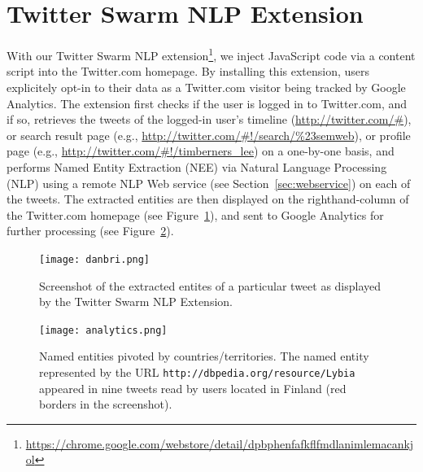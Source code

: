 \documentclass[runningheads,a4paper]{llncs}
\begin{document}
\section{Twitter Swarm NLP Extension}\label{sec:twitterswarm}
With our Twitter Swarm NLP extension\footnote{\url{https://chrome.google.com/webstore/detail/dpbphenfafkflfmdlanimlemacankjol}}, we inject JavaScript code via a content script into the Twitter.com homepage. By installing this extension, users explicitely opt-in to their data as a Twitter.com visitor being tracked by Google Analytics. The extension first checks if the user is logged in to Twitter.com, and if so, retrieves the tweets of the logged-in user's timeline (\url{http://twitter.com/#}), or search result page (e.g., \url{http://twitter.com/#!/search/%23semweb}), or profile page (e.g., \url{http://twitter.com/#!/timberners_lee}) on a one-by-one basis, and performs Named Entity Extraction (NEE) via Natural Language Processing (NLP) using a remote NLP Web service (see Section~\ref{sec:webservice}) on each of the tweets. The extracted entities are then displayed on the righthand-column of the Twitter.com homepage (see Figure~\ref{fig:danbri}), and sent to Google Analytics for further processing (see Figure~\ref{fig:analytics}).

\begin{figure}[ht!]
  \centering
  \texttt{[image: danbri.png]}
  \caption{Screenshot of the extracted entites of a particular tweet as displayed by the Twitter Swarm NLP Extension.}
  \label{fig:danbri}
\end{figure}

\begin{figure}[ht!]
  \centering
  \texttt{[image: analytics.png]}
  \caption{Named entities pivoted by countries/territories. The named entity represented by the URL \texttt{http://dbpedia.org/resource/Lybia} appeared in nine tweets read by users located in Finland (red borders in the screenshot).}
  \label{fig:analytics}
\end{figure}
\end{document}
